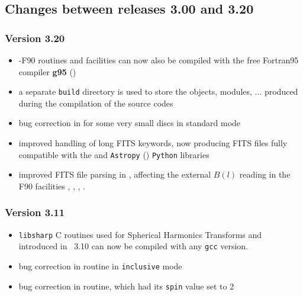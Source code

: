 \documentclass[12pt,twoside]{article}
\newcommand{\mysmaller}{%
\latexhtml{\scriptsize}{\normalsize}}
\begin{document}
{\mysmaller%
\subsection[Changes between releases 3.00 and 3.20]{Changes between releases 3.00 and
3.20}
\subsubsection{Version 3.20} %
\label{sub:new3p20}
\begin{itemize}
	\item \healpixns-F90 routines and facilities can now also be compiled with
the free Fortran95 compiler \textbf{g95} ()
	\item a separate {\tt build} directory is used to store the objects,
modules, ... produced during the compilation of the source codes
	\item bug correction in  for
some very small discs in standard mode
	\item improved handling of long FITS keywords, now producing FITS files
fully compatible with the
and 
{\tt Astropy} ()
{\tt Python} libraries
	\item improved FITS file parsing in 
,
affecting the external $B(l)$ reading in the F90 facilities 
, 
, 
, 
.
\end{itemize}

\subsubsection{Version 3.11} %
\label{sub:new3p11}
\begin{itemize}
	\item {\tt libsharp} C routines used for Spherical Harmonics Transforms 
	and introduced in \healpix\ 3.10
	can now be compiled with any {\tt gcc} version.
	\item bug correction in 
	routine in {\tt inclusive} mode
	\item bug correction in  
	routine, which had its {\tt spin} value set to 2
\end{itemize}

}
\end{document}
